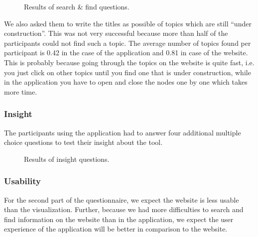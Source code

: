 \begin{figure}[H]
	\centering
	\caption{Results of search \& find questions.}
	\label{fig:evaluation-search-find}
\end{figure}

We also asked them to write the titles as possible of topics which are still ``under construction''. This was not very successful because more than half of the participants could not find such a topic. The average number of topics found per participant is 0.42 in the case of the application and 0.81 in case of the website. This is probably because going through the topics on the website is quite fast, i.e. you just click on other topics until you find one that is under construction, while in the application you have to open and close the nodes one by one which takes more time.

\subsubsection{Insight}
The participants using the application had to answer four additional multiple choice questions to test their insight about the tool.

\begin{figure}[H]
	\centering
	\caption{Results of insight questions.}
	\label{fig:evaluation-insight}
\end{figure}




%	
%	

\subsubsection{Usability}
For the second part of the questionnaire, we expect the website is less usable than the visualization. Further, because we had more difficulties to search and find information on the website than in the application, we expect the user experience of the application will be better in comparison to the website.

